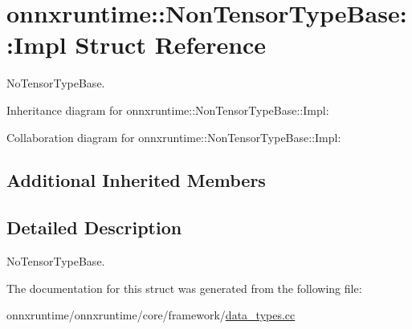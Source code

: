 \hypertarget{structonnxruntime_1_1NonTensorTypeBase_1_1Impl}{}\section{onnxruntime\+:\+:Non\+Tensor\+Type\+Base\+:\+:Impl Struct Reference}
\label{structonnxruntime_1_1NonTensorTypeBase_1_1Impl}


No\+Tensor\+Type\+Base.  




Inheritance diagram for onnxruntime\+:\+:Non\+Tensor\+Type\+Base\+:\+:Impl\+:


Collaboration diagram for onnxruntime\+:\+:Non\+Tensor\+Type\+Base\+:\+:Impl\+:
\subsection*{Additional Inherited Members}


\subsection{Detailed Description}
No\+Tensor\+Type\+Base. 

The documentation for this struct was generated from the following file\+:\begin{DoxyCompactItemize}
\item 
onnxruntime/onnxruntime/core/framework/\mbox{\hyperlink{data__types_8cc}{data\+\_\+types.\+cc}}\end{DoxyCompactItemize}
